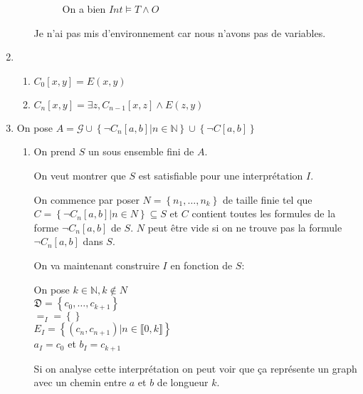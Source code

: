 \documentclass{article}
\begin{document}
\begin{enumerate}
\begin{enumerate}
\begin{description}

                On a bien $Int \models T \wedge O$
        \end{description}
        Je n'ai pas mis d'environnement car nous n'avons pas de variables.
    \end{enumerate}

    \item \begin{enumerate}
        \item $C_0[x, y] = E(x, y)$
        \item $C_n[x, y] = \exists z, C_{n-1}[x, z] \wedge E(z, y)$
    \end{enumerate}

    \item On pose 
    $A = \mathcal{G} \cup \left\{\neg C_n[a,b]|n \in \mathbb{N}\right\} 
        \cup \left\{\neg C[a,b]\right\}$
    \begin{enumerate}
        \item On prend $S$ un sous ensemble fini de $A$.

            On veut montrer que $S$ est satisfiable pour une interprétation $I$.

            On commence par poser $N = \left\{n_1, \ldots , n_k\right\}$ de taille finie
            tel que $C = \left\{\neg C_n[a, b]| n \in N\right\} \subseteq S $ et $C$ 
            contient toutes les formules de la forme $\neg C_n[a, b]$ de $S$.
            $N$ peut être vide si on ne trouve pas la formule $\neg C_n[a, b]$ dans $S$.

            On va maintenant construire $I$ en fonction de $S$:

            On pose $k \in \mathbb{N}, k \notin N$\\
            $\mathfrak{D} = \left\{c_{0}, \ldots, c_{k + 1}\right\}$\\
            $=_I = \left\{\right\} $\\
            $E_I = \left\{(c_n, c_{n+1}) | n \in \llbracket 0, k\rrbracket \right\}$\\
            $a_I = c_0$ et $b_I = c_{k+1}$

            Si on analyse cette interprétation on peut voir que ça représente 
            un graph avec un chemin entre $a$ et $b$ de longueur $k$.


\end{enumerate}
\end{enumerate}
\end{document}
